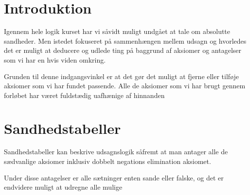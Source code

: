 \ifx\preampleIncluded\undefined
\def\startSamlet{}


\fi


\section{Introduktion}
Igennem hele logik kurset har vi såvidt muligt undgået at tale om absolutte sandheder.
Men istedet fokuseret på sammenhængen mellem udsagn og hvorledes det er
muligt at deducere og udlede ting på baggrund af aksiomer og antagelser som vi har en hvis viden omkring.

Grunden til denne indgangsvinkel er at det gør det muligt at fjerne eller tilføje aksiomer som vi har fundet passende.
Alle de aksiomer som vi har brugt gennem forløbet har været fuldstædig uafhænige af hinnanden

\section{Sandhedstabeller}
Sandhedstabeller kan beskrive udsagnslogik såfremt at man antager alle de sædvanlige aksiomer
inklusiv dobbelt negations elimination aksiomet.

Under disse antagelser er alle sætninger enten sande eller falske, og det er endvidere muligt at udregne alle mulige


\ifdefined\startSamlet\fi
